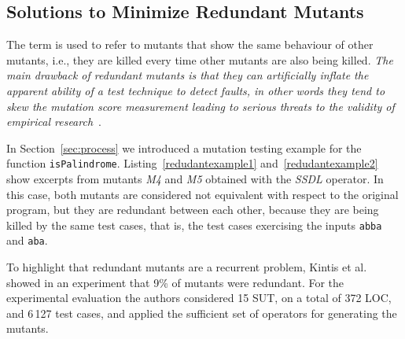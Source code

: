
\subsection{Solutions to Minimize Redundant Mutants}
\label{sec:opt:redundant}

The term  is used to refer to mutants that show the same behaviour of other mutants, i.e., they
are killed every time other mutants are also being killed. 
\emph{The main drawback of redundant mutants is that they can artificially inflate the apparent ability of a test technique to detect faults, in other words they tend to skew the mutation score measurement leading to serious threats to the validity of empirical research}~\cite{papadakis2016threats}.




In Section~\ref{sec:process} we introduced a mutation testing example for the function \texttt{isPalindrome}. 
Listing~\ref{redudantexample1} and~\ref{redudantexample2} show excerpts from mutants \textit{M4} and \textit{M5} obtained with the \textit{SSDL} operator. In this case, both mutants are considered not equivalent with respect to the original program, but they are redundant between each other, because they are being killed by the same test cases, that is, the test cases exercising the inputs \texttt{abba} and \texttt{aba}.


To highlight that redundant mutants are a recurrent problem, Kintis et al.~\cite{kintis2010evaluating} showed in an experiment that 9\% of mutants were redundant. For the experimental evaluation the authors considered 15 SUT, on a total of 372 LOC, and 6\,127 test cases, and applied the sufficient set of operators for generating the mutants. 


